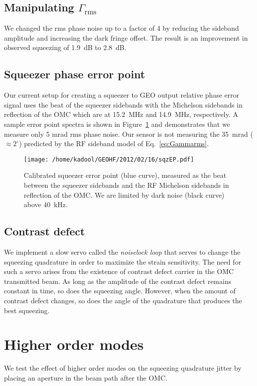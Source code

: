 \documentclass{ligodoc}
\begin{document}
\subsection{Manipulating $\Gamma_{\mathrm{rms}}$}
We changed the rms phase noise up to a factor of 4 by reducing the
sideband amplitude and increasing the dark fringe offset. The result
is an improvement in observed squeezing of 1.9~dB to 2.8~dB.




\subsection{Squeezer phase error point}
Our current setup for creating a squeezer to GEO output relative phase
error signal uses the beat of the squeezer sidebands with the
Michelson sidebands in reflection of the OMC which are at 15.2~MHz and
14.9~MHz, respectively. A sample error point spectra is shown in
Figure~\ref{fig:sqzEP} and demonstrates that we measure only 5 mrad
rms phase noise. Our sensor is not measuring the 35~mrad ($\approx
2^\circ$) predicted by the RF sideband model of Eq.~\ref{eq:Gammarms}.

\begin{figure}
\begin{centering}
\texttt{[image: /home/kadool/GEOHF/2012/02/16/sqzEP.pdf]}
\caption{Calibrated squeezer error point (blue curve), measured as the
  beat between the squeezer sidebands and the RF Michelson sidebands
  in reflection of the OMC. We are limited by dark noise (black curve)
  above 40~kHz.}
\label{fig:sqzEP}
\end{centering}
\end{figure}



\subsection{Contrast defect}
We implement a slow servo called the \emph{noiselock loop} that serves
to change the squeezing quadrature in order to maximize the strain
sensitivity. The need for such a servo arises from the existence of
contrast defect carrier in the OMC transmitted beam. As long as the
amplitude of the contrast defect remains constant in time, so does the
squeezing angle. However, when the amount of contrast defect changes,
so does the angle of the quadrature that produces the best squeezing.


\section{Higher order modes}
We test the effect of higher order modes on the squeezing quadrature
jitter by placing an aperture in the beam path after the OMC. 
\end{document}
